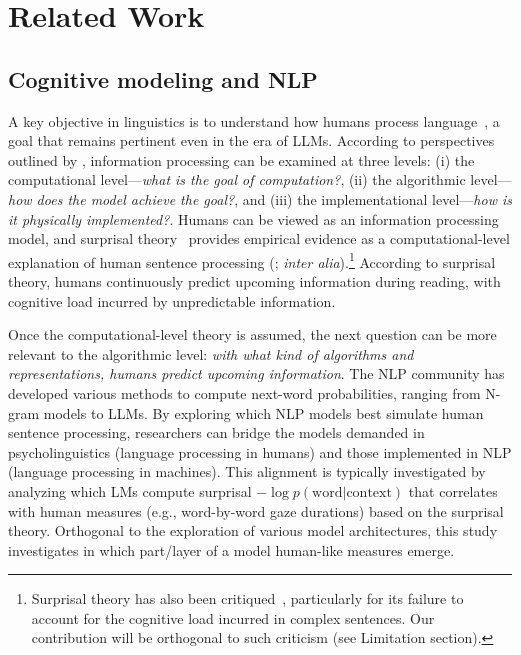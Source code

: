 \section{Related Work}
\label{sec:background}

\subsection{Cognitive modeling and NLP}
\label{subsec:cog_model}


A key objective in linguistics is to understand how humans process language~\cite{Crocker2010-cp}, a goal that remains pertinent even in the era of LLMs. According to perspectives outlined by \citet{marr1982}, information processing can be examined at three levels:
(i) the computational level—\textit{what is the goal of computation?}, 
(ii) the algorithmic level—\textit{how does the model achieve the goal?}, and 
(iii) the implementational level—\textit{how is it physically implemented?}. 
Humans can be viewed as an information processing model, and surprisal theory~\cite{hale-2001-probabilistic,Levy2008Expectation-basedComprehension,Smith2013-ap} provides empirical evidence as a computational-level explanation of human sentence processing (\citealt{Smith2013-ap,FRANK20151,Shain2022-qv}; \textit{inter alia}).\footnote{Surprisal theory has also been critiqued~\cite{Van_Schijndel2021-sm,Huang2024-qe}, particularly for its failure to account for the cognitive load incurred in complex sentences. Our contribution will be orthogonal to such criticism (see Limitation section).} 
According to surprisal theory, humans continuously predict upcoming information during reading, with cognitive load incurred by unpredictable information.

Once the computational-level theory is assumed, the next question can be more relevant to the algorithmic level: 
\textit{with what kind of algorithms and representations, humans predict upcoming information}. 
The NLP community has developed various methods to compute next-word probabilities, ranging from N-gram models to LLMs. 
By exploring which NLP models best simulate human sentence processing, researchers can bridge the models demanded in psycholinguistics (language processing in humans) and those implemented in NLP (language processing in machines). 
This alignment is typically investigated by analyzing which LMs compute surprisal $-\log p(\mathrm{word}|\mathrm{context})$ that correlates with human measures (e.g., word-by-word gaze durations) based on the surprisal theory. 
Orthogonal to the exploration of various model architectures, this study investigates in which part/layer of a model human-like measures emerge. 

